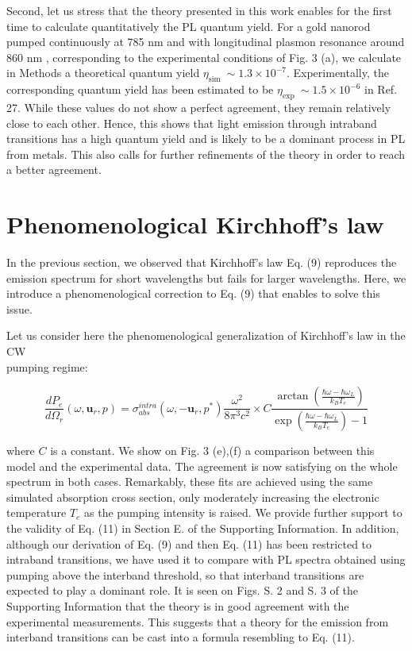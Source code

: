 \documentclass[10pt]{article}
\begin{document}
Second, let us stress that the theory presented in this work enables for the first time to calculate quantitatively the PL quantum yield. For a gold nanorod pumped continuously at 785 nm and with longitudinal plasmon resonance around 860 nm , corresponding to the experimental conditions of Fig. 3 (a), we calculate in Methods a theoretical quantum yield $\eta_{\text {sim }} \sim 1.3 \times 10^{-7}$. Experimentally, the corresponding quantum yield has been estimated to be $\eta_{\text {exp }} \sim 1.5 \times 10^{-6}$ in Ref. 27. While these values do not show a perfect agreement, they remain relatively close to each other. Hence, this shows that light emission through intraband transitions has a high quantum yield and is likely to be a dominant process in PL from metals. This also calls for further refinements of the theory in order to reach a better agreement.

\section*{Phenomenological Kirchhoff's law}
In the previous section, we observed that Kirchhoff's law Eq. (9) reproduces the emission spectrum for short wavelengths but fails for larger wavelengths. Here, we introduce a phenomenological correction to Eq. (9) that enables to solve this issue.

Let us consider here the phenomenological generalization of Kirchhoff's law in the CW\\
pumping regime:


\begin{equation*}
\frac{d P_{e}}{d \Omega_{r}}\left(\omega, \boldsymbol{u}_{r}, p\right)=\sigma_{a b s}^{i n t r a}\left(\omega,-\boldsymbol{u}_{r}, p^{*}\right) \frac{\omega^{2}}{8 \pi^{3} c^{2}} \times C \frac{\arctan \left(\frac{\hbar \omega-\hbar \omega_{L}}{k_{B} T_{e}}\right)}{\exp \left(\frac{\hbar \omega-\hbar \omega_{L}}{k_{B} T_{e}}\right)-1} \tag{11}
\end{equation*}


where $C$ is a constant. We show on Fig. 3 (e),(f) a comparison between this model and the experimental data. The agreement is now satisfying on the whole spectrum in both cases. Remarkably, these fits are achieved using the same simulated absorption cross section, only moderately increasing the electronic temperature $T_{e}$ as the pumping intensity is raised. We provide further support to the validity of Eq. (11) in Section E. of the Supporting Information. In addition, although our derivation of Eq. (9) and then Eq. (11) has been restricted to intraband transitions, we have used it to compare with PL spectra obtained using pumping above the interband threshold, so that interband transitions are expected to play a dominant role. It is seen on Figs. S. 2 and S. 3 of the Supporting Information that the theory is in good agreement with the experimental measurements. This suggests that a theory for the emission from interband transitions can be cast into a formula resembling to Eq. (11).
\end{document}
